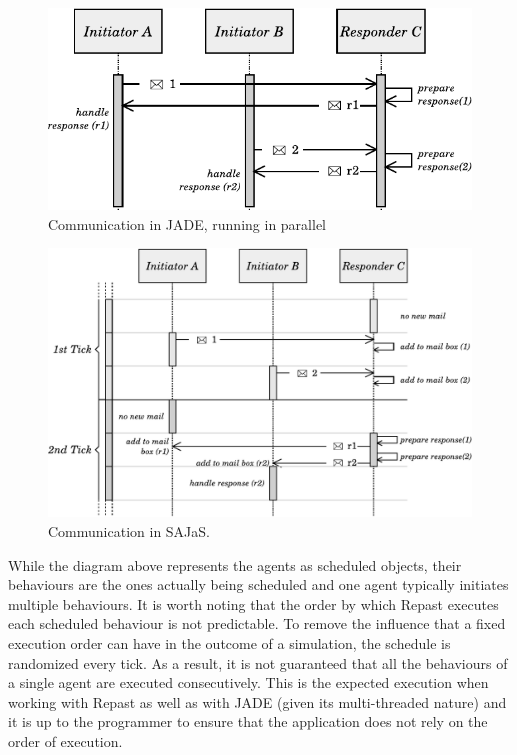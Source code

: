 \documentclass[a4paper,twoside]{article}
\begin{document}
\begin{figure}
	\centering
	\includegraphics[width=0.9\linewidth]{../figures/tickExample2.pdf}
	\caption{
		Communication in JADE, running in parallel
	}
	\label{fig:com-example-jade}
\end{figure}
\vspace{1cm}
\begin{figure}
	\centering
	\includegraphics[width=\linewidth]{../figures/tickExample.pdf}
	\caption{
		Communication in SAJaS.
	}
	\label{fig:com-example-repast}
\end{figure}

While the diagram above represents the agents as scheduled objects, their behaviours are the ones actually being scheduled and one agent typically initiates multiple behaviours. It is worth noting that the order by which Repast executes each scheduled behaviour is not predictable. To remove the influence that a fixed execution order can have in the outcome of a simulation, the schedule is randomized every tick. As a result, it is not guaranteed that all the behaviours of a single agent are executed consecutively. This is the expected execution when working with Repast as well as with JADE (given its multi-threaded nature) and it is up to the programmer to ensure that the application does not rely on the order of execution.
\end{document}
